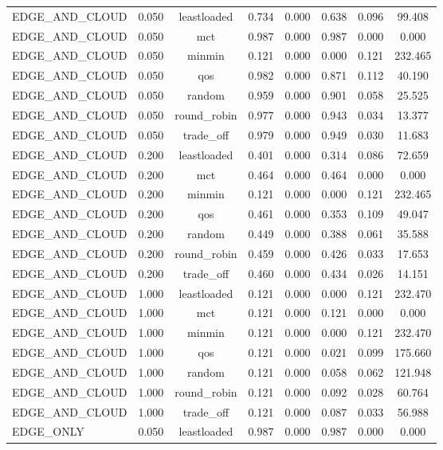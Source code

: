 \begin{table}
\begin{tabular}{lccccccc}
EDGE\_AND\_CLOUD & 0.050 & leastloaded & 0.734 & 0.000 & 0.638 & 0.096 & 99.408 \\
EDGE\_AND\_CLOUD & 0.050 & mct & 0.987 & 0.000 & 0.987 & 0.000 & 0.000 \\
EDGE\_AND\_CLOUD & 0.050 & minmin & 0.121 & 0.000 & 0.000 & 0.121 & 232.465 \\
EDGE\_AND\_CLOUD & 0.050 & qos & 0.982 & 0.000 & 0.871 & 0.112 & 40.190 \\
EDGE\_AND\_CLOUD & 0.050 & random & 0.959 & 0.000 & 0.901 & 0.058 & 25.525 \\
EDGE\_AND\_CLOUD & 0.050 & round\_robin & 0.977 & 0.000 & 0.943 & 0.034 & 13.377 \\
EDGE\_AND\_CLOUD & 0.050 & trade\_off & 0.979 & 0.000 & 0.949 & 0.030 & 11.683 \\
EDGE\_AND\_CLOUD & 0.200 & leastloaded & 0.401 & 0.000 & 0.314 & 0.086 & 72.659 \\
EDGE\_AND\_CLOUD & 0.200 & mct & 0.464 & 0.000 & 0.464 & 0.000 & 0.000 \\
EDGE\_AND\_CLOUD & 0.200 & minmin & 0.121 & 0.000 & 0.000 & 0.121 & 232.465 \\
EDGE\_AND\_CLOUD & 0.200 & qos & 0.461 & 0.000 & 0.353 & 0.109 & 49.047 \\
EDGE\_AND\_CLOUD & 0.200 & random & 0.449 & 0.000 & 0.388 & 0.061 & 35.588 \\
EDGE\_AND\_CLOUD & 0.200 & round\_robin & 0.459 & 0.000 & 0.426 & 0.033 & 17.653 \\
EDGE\_AND\_CLOUD & 0.200 & trade\_off & 0.460 & 0.000 & 0.434 & 0.026 & 14.151 \\
EDGE\_AND\_CLOUD & 1.000 & leastloaded & 0.121 & 0.000 & 0.000 & 0.121 & 232.470 \\
EDGE\_AND\_CLOUD & 1.000 & mct & 0.121 & 0.000 & 0.121 & 0.000 & 0.000 \\
EDGE\_AND\_CLOUD & 1.000 & minmin & 0.121 & 0.000 & 0.000 & 0.121 & 232.470 \\
EDGE\_AND\_CLOUD & 1.000 & qos & 0.121 & 0.000 & 0.021 & 0.099 & 175.660 \\
EDGE\_AND\_CLOUD & 1.000 & random & 0.121 & 0.000 & 0.058 & 0.062 & 121.948 \\
EDGE\_AND\_CLOUD & 1.000 & round\_robin & 0.121 & 0.000 & 0.092 & 0.028 & 60.764 \\
EDGE\_AND\_CLOUD & 1.000 & trade\_off & 0.121 & 0.000 & 0.087 & 0.033 & 56.988 \\
EDGE\_ONLY & 0.050 & leastloaded & 0.987 & 0.000 & 0.987 & 0.000 & 0.000 \\

\end{tabular}
\end{table}
